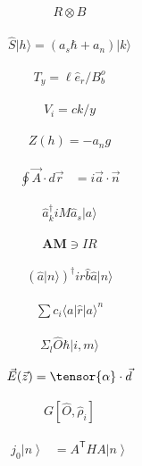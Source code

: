 \documentclass[twocolumn,pra,aps,superscriptaddress]{revtex4-1}
\newcommand{\bra}[1]{\langle{#1}|}
\newcommand{\ket}[1]{|{#1}\rangle}
\begin{document}
\begin{align}
R\otimes B
\end{align}

\begin{align}
\hat S\ket{h} = (a_s\hbar + a_n)\ket{k}
\end{align}

\begin{align}
T_y = \ell\hat{e}_r/B_b^o
\end{align}

\begin{align}
V_i =c k/y
\end{align}

\begin{align}
Z(h) = -a_n g
\end{align}

\begin{align}
\oint \vec{A} \cdot d \vec{r} &= i \vec{a} \cdot \vec{n}
\end{align}

\begin{align}
\hat{a}^{\dagger}_k i M \hat{a}_s \ket{a}
\end{align}

\begin{align} %
\mathbf{AM} \ni IR
\end{align}

\begin{align} %
\left(\hat{a} \ket{n} \right)^{\dagger} i r  \hat{b} \hat{a} \ket{n}
\end{align}

\begin{align} %
\sum c_i \bra{a} \hat{r} \ket{a}^n
\end{align}

\begin{align} %
\Sigma_{l} \hat{O} \hbar \ket{i, m}
\end{align}

\begin{align} %
\vec{E}(\vec{z}) = \tensor{\alpha} \cdot \vec{d}
\end{align}

\begin{align} %
G\left[\hat{O}, \hat{\rho}_i \right]
\end{align}

\begin{align}
j_0\left\vert n\right\rangle&=A^\mathsf{T}HA\left\vert n\right\rangle
\end{align}
\end{document}
